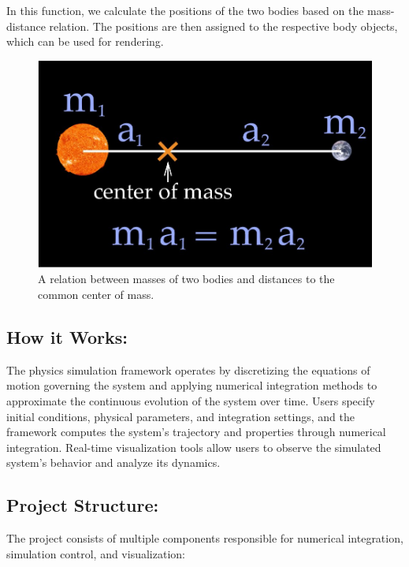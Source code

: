 \documentclass{article}
\begin{document}
In this function, we calculate the positions of the two bodies based on the mass-distance relation. The positions are then assigned to the respective body objects, which can be used for rendering.

\begin{figure}[b]
    \centering
    \includegraphics[width=0.5\linewidth]{mass_distance_relation.jpg}
    \caption{A relation between masses of two bodies and distances to the common center of mass.}
    \label{fig:mass_distance}
\end{figure}

\newpage
\subsection*{How it Works:}
The physics simulation framework operates by discretizing the equations of motion governing the system and applying numerical integration methods to approximate the continuous evolution of the system over time. Users specify initial conditions, physical parameters, and integration settings, and the framework computes the system's trajectory and properties through numerical integration. Real-time visualization tools allow users to observe the simulated system's behavior and analyze its dynamics.
\subsection*{Project Structure:}
The project consists of multiple components responsible for numerical integration, simulation control, and visualization:
\end{document}
